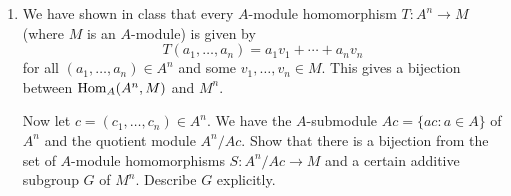 \documentclass[../psets.tex]{subfiles}
\begin{document}
\begin{enumerate}
\begin{proof}
\begin{align*}
            &= \frac{1}{bc}f(bc(v_1+v_2))\\
            &= \frac{1}{a}f(a(v_1+v_2))\\
            &= F(v_1+v_2)
        \end{align*}
        as desired, where the fourth equality holds by the above argument used to show that $F$ is well-defined.\par
        To prove that $F$ is a $K$-module homomorphism, it will suffice to additionally show that $F(kv)=kF(v)$ for all $k\in K$ and $v\in V$. Let $k=l/n\in K$ and $v\in V$ be arbitrary. Then
        \begin{equation*}
            kF(v) = \frac{l}{n}\cdot\frac{1}{a}f(av)
            = \frac{1}{a}f(a(kv))
            = F(kv)
        \end{equation*}
        as desired.\par
        To prove that $F$ is an extension of $f$, it will suffice to show that for all $m\in M$, $F(m)=f(m)$. Let $m\in M$ be arbitrary. Then
        \begin{equation*}
            F(m) = \frac{1}{a}f(am)
            = \frac{a}{a}f(m)
            = f(m)
        \end{equation*}
        as desired.\par
        To prove that $F$ is unique, it will suffice to show that if $\tilde{F}:V\to W$ is an extension of $f$ to $V$, then $F=\tilde{F}$. Let $v\in V$ be arbitrary. Then
        \begin{equation*}
            F(v) = \frac{1}{a}f(av)
            = \frac{1}{a}\tilde{F}(av)
            = \frac{a}{a}\tilde{F}(v)
            = \tilde{F}(v)
        \end{equation*}
        where the second equality holds because $\tilde{F}=f$ on $M$ by definition and $av\in M$.
    \end{proof}
    \item We have shown in class that every $A$-module homomorphism $T:A^n\to M$ (where $M$ is an $A$-module) is given by
    \begin{equation*}
        T(a_1,\dots,a_n) = a_1v_1+\cdots+a_nv_n
    \end{equation*}
    for all $(a_1,\dots,a_n)\in A^n$ and some $v_1,\dots,v_n\in M$. This gives a bijection between $\operatorname{Hom}_A(A^n,M)$ and $M^n$.\par
    Now let $c=(c_1,\dots,c_n)\in A^n$. We have the $A$-submodule $Ac=\{ac:a\in A\}$ of $A^n$ and the quotient module $A^n/Ac$. Show that there is a bijection from the set of $A$-module homomorphisms $S:A^n/Ac\to M$ and a certain additive subgroup $G$ of $M^n$. Describe $G$ explicitly.\par

\end{enumerate}
\end{document}
